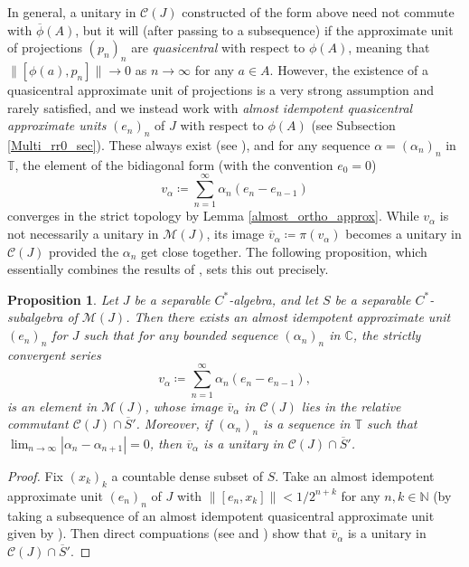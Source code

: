 \documentclass[reqno]{amsart}
\newtheorem{prop}[thm]{Proposition}
\theoremstyle{definition}
\theoremstyle{remark}
\numberwithin{equation}{section}
\theoremstyle{definition}
\newcommand{\calC}{\mathcal{C}}
\newcommand{\calM}{\mathcal{M}}
\begin{document}
In general, a unitary in $\calC(J)$ constructed of the form above need not commute with $\overline{\phi}(A)$, but it will (after passing to a subsequence) if the approximate unit of projections $(p_{n})_{n}$ are \emph{quasicentral} with respect to $\phi(A)$, meaning that $\|[\phi(a), p_{n}]\| \rightarrow 0$ as $n\rightarrow \infty$ for any $a\in A$. However, the existence of a quasicentral approximate unit of projections is a very strong assumption and rarely satisfied, and we instead work with \emph{almost idempotent quasicentral approximate units} $(e_{n})_{n}$ of $J$ with respect to $\phi(A)$ (see Subsection \ref{Multi_rr0_sec}). These always exist (see \cite[Theorem I.9.16]{Davidson}), and for any sequence $\alpha = (\alpha_{n})_{n}$ in $\mathbb{T}$, the element of the bidiagonal form (with the convention $e_{0}=0$) 
\begin{equation} 
v_{\alpha} \coloneqq \sum_{n=1}^{\infty} \alpha_{n} (e_{n} - e_{n-1}) 
\end{equation} 
converges in the strict topology by Lemma \ref{almost_ortho_approx}. While $v_{\alpha}$ is not necessarily a unitary in $\calM(J)$, its image $\overline{v}_{\alpha}\coloneqq \pi(v_\alpha)$ becomes a unitary in $\calC(J)$ provided the $\alpha_n$ get close together. The following proposition, which essentially combines the results of \cite[Lemma 3.2, Lemma 3.3]{K1-injective}, sets this out precisely.

\begin{prop}
\label{unitary_commutant} 
Let $J$ be a separable $C^*$-algebra, and let $S$ be a separable $C^*$-subalgebra of $\mathcal M(J)$. Then there exists an almost idempotent approximate unit $(e_n)_{n}$ for $J$ such that for any bounded sequence $(\alpha_n)_n$ in $\mathbb{C}$, the strictly convergent series
\begin{equation}
\label{v_alpha} 
v_\alpha\coloneqq\sum_{n=1}^\infty \alpha_n (e_n-e_{n-1}), 
\end{equation} 
is an element in $\calM(J)$, whose image $\overline{v}_{\alpha}$ in $\calC(J)$ lies in the relative commutant $\mathcal C(J)\cap\overline{S}'$.  Moreover, if $(\alpha_{n})_{n}$ is a sequence in $\mathbb{T}$ such that $\lim_{n\to\infty}|\alpha_n-\alpha_{n+1}|=0$, then $\overline{v}_\alpha$ is a unitary in $\calC(J)\cap\overline{S}'$.
\end{prop} 

\begin{proof} 
Fix $(x_{k})_{k}$ a countable dense subset of $S$. Take an almost idempotent approximate unit $(e_{n})_{n}$ of $J$ with $\|[e_{n}, x_{k}]\|<1/2^{n+k}$ for any $n, k\in \mathbb{N}$ (by taking a subsequence of an almost idempotent quasicentral approximate unit given by \cite[Theorem I.9.16]{Davidson}). Then direct compuations (see \cite[Lemma 3.3]{K1-injective} and \cite[Lemma 3.2]{K1-injective}) show that $\overline{v}_{\alpha}$ is a unitary in $\calC(J) \cap \overline{S}'$.
\end{proof} 
\end{document}
